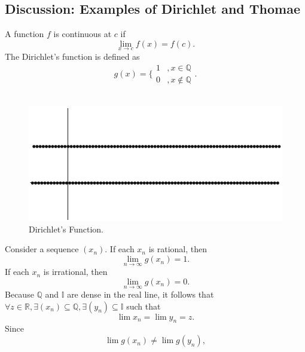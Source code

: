 \documentclass{article}
\begin{document}
            \subsection{Discussion: Examples of Dirichlet and Thomae}
            A function $f$ is continuous at $c$ if
            \begin{equation*}
                \lim_{x \to c} f(x) = f(c).
            \end{equation*}
            The Dirichlet's function is defined as
            \begin{equation*}
                g(x) = \bigg\{ \begin{matrix} 1 & ,x \in \mathbb{Q} \\ 0 & , x \notin \mathbb{Q}\end{matrix}.
            \end{equation*}
            \\
            \begin{figure}[ht!]
                \centering
                \includegraphics[width=0.6\linewidth]{figs/dirichlet.png}
                \caption{Dirichlet's Function.}
                \label{dirichlet}
            \end{figure}
            Consider a sequence $(x_n)$. If each $x_n$ is rational, then
            \begin{equation*}
                \lim_{n \to \infty} g(x_n) = 1.
            \end{equation*}
            If each $x_n$ is irrational, then
            \begin{equation*}
                \lim_{n \to \infty} g(x_n) = 0.
            \end{equation*}
            Because $\mathbb{Q}$ and $\mathbb{I}$ are dense in the real line, it follows that $\forall z \in \mathbb{R}, \exists (x_n) \subseteq \mathbb{Q}, \exists (y_n) \subseteq \mathbb{I}$ such that
            \begin{equation*}
                \lim x_n = \lim y_n = z.
            \end{equation*}
            Since
            \begin{equation*}
                \lim g(x_n) \neq \lim g(y_n),
            \end{equation*}
\end{document}

